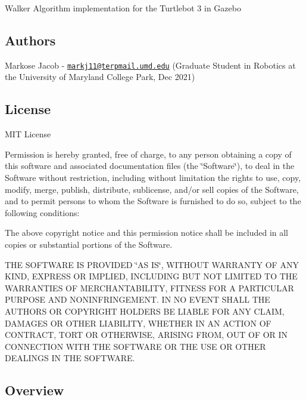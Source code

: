 \href{https://github.com/markosej11/turtlebot3_walker/LICENSE}{\tt }

Walker Algorithm implementation for the Turtlebot 3 in Gazebo

\subsection*{Authors}

Markose Jacob -\/ \href{mailto:markj11@terpmail.umd.edu}{\tt markj11@terpmail.\+umd.\+edu} (Graduate Student in Robotics at the University of Maryland College Park, Dec 2021)

\subsection*{License}

M\+IT License

Permission is hereby granted, free of charge, to any person obtaining a copy of this software and associated documentation files (the \char`\"{}\+Software\char`\"{}), to deal in the Software without restriction, including without limitation the rights to use, copy, modify, merge, publish, distribute, sublicense, and/or sell copies of the Software, and to permit persons to whom the Software is furnished to do so, subject to the following conditions\+:

The above copyright notice and this permission notice shall be included in all copies or substantial portions of the Software.

T\+HE S\+O\+F\+T\+W\+A\+RE IS P\+R\+O\+V\+I\+D\+ED \char`\"{}\+A\+S I\+S\char`\"{}, W\+I\+T\+H\+O\+UT W\+A\+R\+R\+A\+N\+TY OF A\+NY K\+I\+ND, E\+X\+P\+R\+E\+SS OR I\+M\+P\+L\+I\+ED, I\+N\+C\+L\+U\+D\+I\+NG B\+UT N\+OT L\+I\+M\+I\+T\+ED TO T\+HE W\+A\+R\+R\+A\+N\+T\+I\+ES OF M\+E\+R\+C\+H\+A\+N\+T\+A\+B\+I\+L\+I\+TY, F\+I\+T\+N\+E\+SS F\+OR A P\+A\+R\+T\+I\+C\+U\+L\+AR P\+U\+R\+P\+O\+SE A\+ND N\+O\+N\+I\+N\+F\+R\+I\+N\+G\+E\+M\+E\+NT. IN NO E\+V\+E\+NT S\+H\+A\+LL T\+HE A\+U\+T\+H\+O\+RS OR C\+O\+P\+Y\+R\+I\+G\+HT H\+O\+L\+D\+E\+RS BE L\+I\+A\+B\+LE F\+OR A\+NY C\+L\+A\+IM, D\+A\+M\+A\+G\+ES OR O\+T\+H\+ER L\+I\+A\+B\+I\+L\+I\+TY, W\+H\+E\+T\+H\+ER IN AN A\+C\+T\+I\+ON OF C\+O\+N\+T\+R\+A\+CT, T\+O\+RT OR O\+T\+H\+E\+R\+W\+I\+SE, A\+R\+I\+S\+I\+NG F\+R\+OM, O\+UT OF OR IN C\+O\+N\+N\+E\+C\+T\+I\+ON W\+I\+TH T\+HE S\+O\+F\+T\+W\+A\+RE OR T\+HE U\+SE OR O\+T\+H\+ER D\+E\+A\+L\+I\+N\+GS IN T\+HE S\+O\+F\+T\+W\+A\+RE.

\subsection*{Overview}

